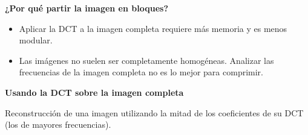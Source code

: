 \documentclass{beamer}
\begin{document}
\begin{frame}
    \textbf{¿Por qué partir la imagen en bloques?}
    \begin{itemize}
        \item Aplicar la DCT a la imagen completa requiere más memoria y es menos modular. %
        \item Las imágenes no suelen ser completamente homogéneas. Analizar las frecuencias de la imagen completa no es lo mejor para comprimir.
    \end{itemize}
\end{frame}

\begin{frame}


    \textbf{Usando la DCT sobre la imagen completa}

    Reconstrucción de una imagen utilizando la mitad de los coeficientes de su DCT (los de mayores frecuencias).


\end{frame}
\end{document}
